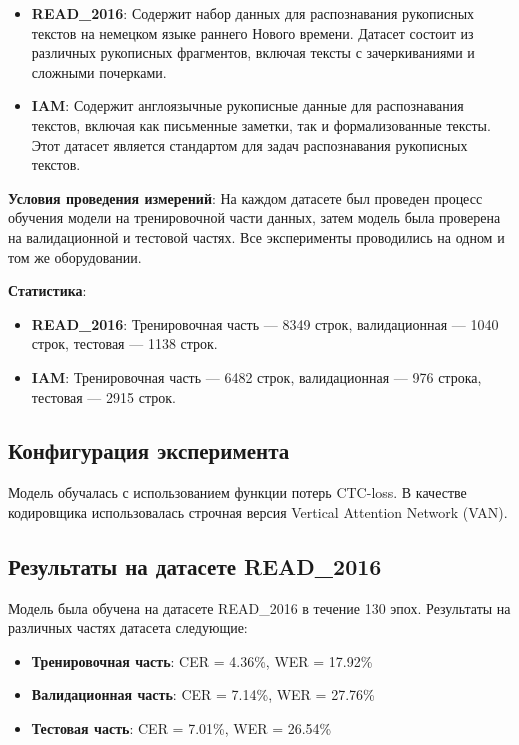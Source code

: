 \documentclass{extarticle}
\begin{document}
\begin{itemize}
	\item \textbf{READ\_2016}: Содержит набор данных для распознавания рукописных текстов на немецком языке раннего Нового времени. Датасет состоит из различных рукописных фрагментов, включая тексты с зачеркиваниями и сложными почерками.
	\item \textbf{IAM}: Содержит англоязычные рукописные данные для распознавания текстов, включая как письменные заметки, так и формализованные тексты. Этот датасет является стандартом для задач распознавания рукописных текстов.
\end{itemize}

\textbf{Условия проведения измерений}: На каждом датасете был проведен процесс обучения модели на тренировочной части данных, затем модель была проверена на валидационной и тестовой частях. Все эксперименты проводились на одном и том же оборудовании.

\textbf{Статистика}: 
\begin{itemize}
	\item \textbf{READ\_2016}: Тренировочная часть — 8349 строк, валидационная — 1040 строк, тестовая — 1138 строк.
	\item \textbf{IAM}: Тренировочная часть — 6482 строк, валидационная — 976 строка, тестовая — 2915 строк.
\end{itemize}

\subsection{Конфигурация эксперимента}

Модель обучалась с использованием функции потерь CTC-loss. В качестве кодировщика использовалась строчная версия Vertical Attention Network (VAN). 

\subsection{Результаты на датасете READ\_2016}

Модель была обучена на датасете READ\_2016 в течение 130 эпох. Результаты на различных частях датасета следующие:

\begin{itemize}
	\item \textbf{Тренировочная часть}: CER = 4.36\%, WER = 17.92\%
	\item \textbf{Валидационная часть}: CER = 7.14\%, WER = 27.76\%
	\item \textbf{Тестовая часть}: CER = 7.01\%, WER = 26.54\%
\end{itemize}
\end{document}
